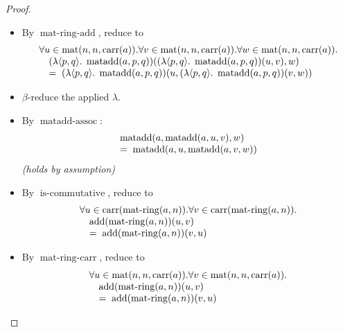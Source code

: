 \documentclass[11pt]{article}
\theoremstyle{plain}
\begin{document}
\begin{proof}
\begin{itemize}[leftmargin=2.8em, itemsep=4pt, parsep=1pt]
  \item[\textbf{49}] By $\operatorname{mat\text{-}ring\text{-}add}$, reduce to
\begin{equation*}
\begin{array}{@{}l@{}} \forall u \in \operatorname{mat}(n, n, \operatorname{carr}(a)). \forall v \in \operatorname{mat}(n, n, \operatorname{carr}(a)). \forall w \in \operatorname{mat}(n, n, \operatorname{carr}(a)). \\ \quad (\lambda \langle p, q \rangle.\; \operatorname{matadd}(a, p, q))((\lambda \langle p, q \rangle.\; \operatorname{matadd}(a, p, q))(u, v), w) \\ \quad =\; (\lambda \langle p, q \rangle.\; \operatorname{matadd}(a, p, q))(u, (\lambda \langle p, q \rangle.\; \operatorname{matadd}(a, p, q))(v, w)) \end{array}
\end{equation*}

  \item[\textbf{50}] $\beta$-reduce the applied $\lambda$.
  \item[\textbf{51--53}] By $\operatorname{matadd\text{-}assoc}$:
\begin{equation*}
\begin{array}{@{}l@{}} \operatorname{matadd}(a, \operatorname{matadd}(a, u, v), w) \\ =\; \operatorname{matadd}(a, u, \operatorname{matadd}(a, v, w)) \end{array}
\end{equation*}
  \emph{(holds by assumption)}
  \item[\textbf{54}] By $\operatorname{is\text{-}commutative}$, reduce to
\begin{equation*}
\begin{array}{@{}l@{}} \forall u \in \operatorname{carr}(\operatorname{mat\text{-}ring}(a, n)). \forall v \in \operatorname{carr}(\operatorname{mat\text{-}ring}(a, n)). \\ \quad \operatorname{add}(\operatorname{mat\text{-}ring}(a, n))(u, v) \\ \quad =\; \operatorname{add}(\operatorname{mat\text{-}ring}(a, n))(v, u) \end{array}
\end{equation*}

  \item[\textbf{55}] By $\operatorname{mat\text{-}ring\text{-}carr}$, reduce to
\begin{equation*}
\begin{array}{@{}l@{}} \forall u \in \operatorname{mat}(n, n, \operatorname{carr}(a)). \forall v \in \operatorname{mat}(n, n, \operatorname{carr}(a)). \\ \quad \operatorname{add}(\operatorname{mat\text{-}ring}(a, n))(u, v) \\ \quad =\; \operatorname{add}(\operatorname{mat\text{-}ring}(a, n))(v, u) \end{array}
\end{equation*}


\end{itemize}
\end{proof}
\end{document}
